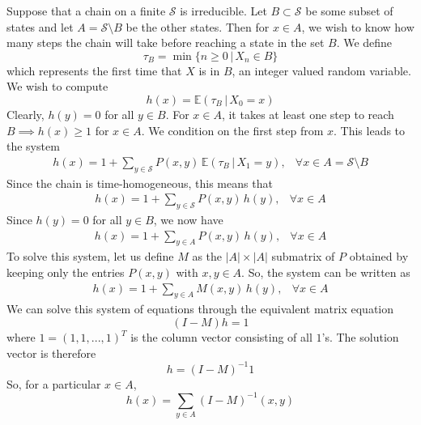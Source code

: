     Suppose that a chain on a finite $\mathcal{S}$ is irreducible. Let $B \subset \mathcal{S}$ be some subset of states and let $A = \mathcal{S} \setminus B$ be the other states. Then for $x \in A$, we wish to know how many steps the chain will take before reaching a state in the set $B$. We define 
    \begin{equation}
      \tau_B = \min\{n \geq 0 \,|\, X_n \in B\}
    \end{equation}
    which represents the first time that $X$ is in $B$, an integer valued random variable. We wish to compute
    \begin{equation}
      h(x) = \mathbb{E}(\tau_B \,|\, X_0 = x)
    \end{equation}
    Clearly, $h(y) = 0$ for all $y \in B$. For $x \in A$, it takes at least one step to reach $B \implies h(x) \geq 1$ for $x \in A$. We condition on the first step from $x$. This leads to the system 
    \begin{align*}
      h(x) = 1 + \sum_{y \in \mathcal{S}} P(x, y) \, \mathbb{E}(\tau_B \,|\, X_1 = y), & \forall x \in A = \mathcal{S} \setminus B
    \end{align*}
    Since the chain is time-homogeneous, this means that
    \begin{align*}
      h(x) = 1 + \sum_{y \in \mathcal{S}} P(x, y) \, h(y), & \forall x \in A 
    \end{align*}
    Since $h(y) = 0$ for all $y \in B$, we now have
    \begin{align*}
      h(x) = 1 + \sum_{y \in A} P(x, y) \, h(y), & \forall x \in A 
    \end{align*}
    To solve this system, let us define $M$ as the $|A| \times |A|$ submatrix of $P$ obtained by keeping only the entries $P(x, y)$ with $x, y \in A$. So, the system can be written as
    \begin{align*}
      h(x) = 1 + \sum_{y \in A} M(x, y) \, h(y), & \forall x \in A
    \end{align*}
    We can solve this system of equations through the equivalent matrix equation
    \begin{equation}
      (I - M) h = 1
    \end{equation}
    where $1 = (1, 1, ..., 1)^T$ is the column vector consisting of all $1$'s. The solution vector is therefore
    \begin{equation}
      h = (I - M)^{-1} 1
    \end{equation}
    So, for a particular $x \in A$, 
    \begin{equation}
      h(x) = \sum_{y \in A} (I - M)^{-1} (x, y)
    \end{equation}

